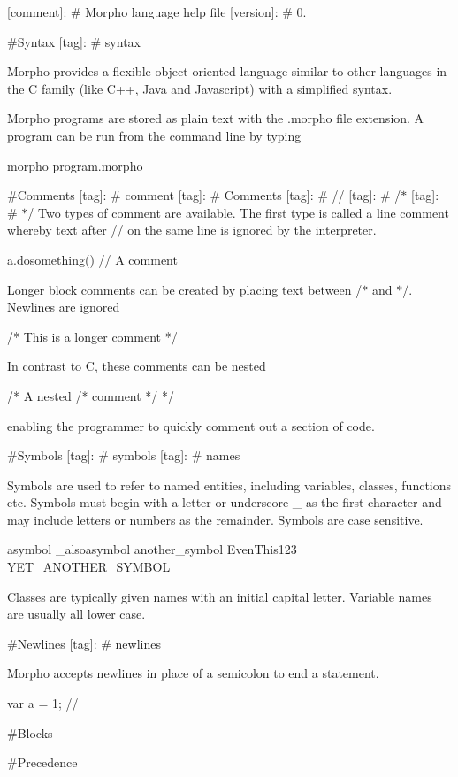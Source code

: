 \mbox{[}comment\mbox{]}\+: \# Morpho language help file \mbox{[}version\mbox{]}\+: \# 0.

\#\+Syntax \mbox{[}tag\mbox{]}\+: \# syntax

Morpho provides a flexible object oriented language similar to other languages in the C family (like C++, Java and Javascript) with a simplified syntax.

Morpho programs are stored as plain text with the .morpho file extension. A program can be run from the command line by typing \begin{DoxyVerb}morpho program.morpho
\end{DoxyVerb}


\#\+Comments \mbox{[}tag\mbox{]}\+: \# comment \mbox{[}tag\mbox{]}\+: \# Comments \mbox{[}tag\mbox{]}\+: \# // \mbox{[}tag\mbox{]}\+: \# /$\ast$ \mbox{[}tag\mbox{]}\+: \# $\ast$/ Two types of comment are available. The first type is called a \textquotesingle{}line comment\textquotesingle{} whereby text after {\ttfamily //} on the same line is ignored by the interpreter. \begin{DoxyVerb}a.dosomething() // A comment
\end{DoxyVerb}


Longer \textquotesingle{}block\textquotesingle{} comments can be created by placing text between {\ttfamily /$\ast$} and {\ttfamily $\ast$/}. Newlines are ignored \begin{DoxyVerb}/* This
   is
   a longer comment */
\end{DoxyVerb}


In contrast to C, these comments can be nested \begin{DoxyVerb}/* A nested /* comment */ */
\end{DoxyVerb}


enabling the programmer to quickly comment out a section of code.

\#\+Symbols \mbox{[}tag\mbox{]}\+: \# symbols \mbox{[}tag\mbox{]}\+: \# names

Symbols are used to refer to named entities, including variables, classes, functions etc. Symbols must begin with a letter or underscore \+\_\+ as the first character and may include letters or numbers as the remainder. Symbols are case sensitive. \begin{DoxyVerb}asymbol
_alsoasymbol
another_symbol
EvenThis123
YET_ANOTHER_SYMBOL
\end{DoxyVerb}


Classes are typically given names with an initial capital letter. Variable names are usually all lower case.

\#\+Newlines \mbox{[}tag\mbox{]}\+: \# newlines

Morpho accepts newlines in place of a semicolon to end a statement. \begin{DoxyVerb}var a = 1; // 
\end{DoxyVerb}


\#\+Blocks

\#\+Precedence 